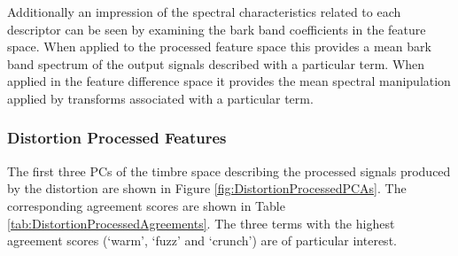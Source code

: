 		Additionally an impression of the spectral characteristics related to each descriptor can be seen by
		examining the bark band coefficients in the feature space. When applied to the processed feature space this
		provides a mean bark band spectrum of the output signals described with a particular term. When applied in
		the feature difference space it provides the mean spectral manipulation applied by transforms associated
		with a particular term.

		\subsubsection*{Distortion Processed Features}
			The first three PCs of the timbre space describing the processed signals produced by the distortion
			are shown in Figure \ref{fig:DistortionProcessedPCAs}. The corresponding agreement scores are shown
			in Table \ref{tab:DistortionProcessedAgreements}. The three terms with the highest agreement scores
			(`warm', `fuzz' and `crunch') are of particular interest.

